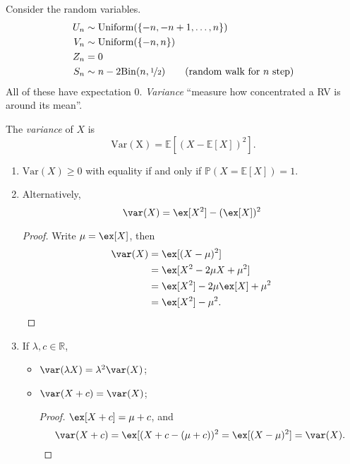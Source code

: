 Consider the random variables.
\begin{align*}
    U_n &\sim \mathrm{Uniform}(\{-n, -n + 1, \dots, n\})\\
    V_n &\sim \mathrm{Uniform}(\{-n, n\})\\
    Z_n &= 0\\
    S_n &\sim n - 2 \mathrm{Bin}(n, \nicefrac{1}{2})\qquad \text{(random walk for \(n\) step)}
\end{align*}
All of these have expectation \(0\). \textit{Variance} ``measure how concentrated a RV is around its mean''.
\begin{definition}{}{}
    The \textit{variance} of \(X\) is
    \[
        \mathrm{Var(X)} = \mathbb{E}[(X - \mathbb{E}[X])^2].
    \]
\end{definition}
\begin{property}
    \begin{enumerate}
        \item \(\mathrm{Var}(X) \geq 0\) with equality if and only if \(\mathbb{P}(X = \mathbb{E}[X]) = 1\).
        \item Alternatively,
        \[
            \var(X) = \ex[X^2] - (\ex[X])^2\\
        \]
        \begin{proof}
            Write \(\mu = \ex[X]\), then
            \begin{align*}
                \var(X) &= \ex[(X - \mu)^2]\\
                &= \ex[X^2 - 2\mu X + \mu^2]\\
                &= \ex[X^2] - 2\mu\ex[X] + \mu^2\\
                &= \ex[X^2] - \mu^2.
            \end{align*}
        \end{proof}
        \item If \(\lambda, c \in \mathbb{R}\),
        \begin{itemize}
            \item \(\var(\lambda X) = \lambda^2 \var(X)\);
            \item \(\var(X + c) = \var(X)\);
            \begin{proof}
                \(\ex[X + c] = \mu + c\), and
                \[
                    \var(X + c) = \ex[(X + c - (\mu + c))^2 = \ex[(X - \mu)^2] = \var(X).
                \]
            \end{proof}
        \end{itemize}
    \end{enumerate}
\end{property}
